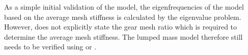 As a simple initial validation of the model, the eigenfrequencies of the model based on the average mesh stiffness is calculated by the eigenvalue problem. However, \cite{Chaari2006} does not explicitly state the gear mesh ratio which is required to determine the average mesh stiffness. The lumped mass model therefore still needs to be verified using \cite{Chaari2006} or \cite{Lin1999}.






